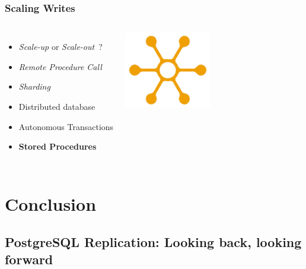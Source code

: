 \documentclass[english]{beamer}
\begin{document}
\begin{frame}[fragile]
  \frametitle{Scaling Writes}

  \vfill

\begin{columns}[c]

  \begin{itemize}
   \item<1-> \textit{Scale-up} or \textit{Scale-out} ?
   \item<2-> \textit{Remote Procedure Call}
   \item<3-> \textit{Sharding}
   \item<3-> Distributed database
   \item<4-> Autonomous Transactions
   \item<5-> \textbf{Stored Procedures}
  \end{itemize}  

\includegraphics[height=9em]{distribution.jpg}
\end{columns}
\end{frame}


\section{Conclusion}
\subsection{PostgreSQL Replication: Looking back, looking forward}
\frame{\tableofcontents[currentsubsection]}
\end{document}
